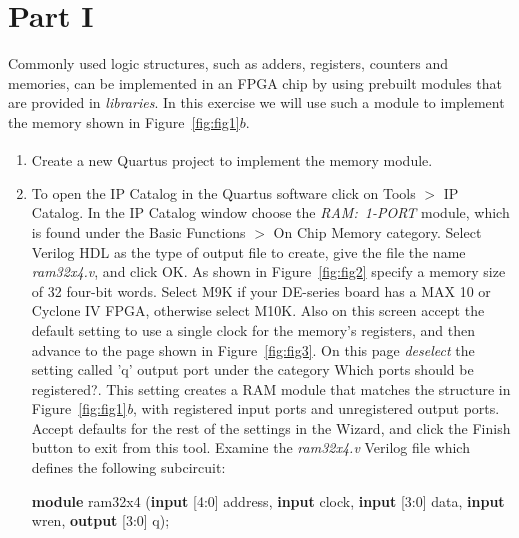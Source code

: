 \documentclass[epsfig,10pt,fullpage]{article}
\begin{document}
\section*{Part I}
Commonly used logic structures, such as adders, registers, counters and memories, 
can be implemented in an FPGA chip by using prebuilt modules that are provided in 
{\it libraries}.  In this exercise we will use such a module to implement the memory 
shown in Figure~\ref{fig:fig1}$b$.

\begin{enumerate}
\item Create a new Quartus\textsuperscript{\textregistered} project to implement the memory module.

\item To open the IP Catalog in the Quartus software click on {\sf Tools} $>$ {\sf IP Catalog}. 
In the IP Catalog window choose the {\it RAM:~1-PORT} module, which is found under 
the {\sf Basic Functions $>$  On Chip Memory} category.  Select {\sf Verilog HDL} as the type 
of output file to create, give the file the name {\it ram32x4.v}, and click {\sf OK}. 
As shown in Figure~\ref{fig:fig2} specify a memory size of 32 four-bit words. Select M9K if 
your DE-series board has a MAX 10 or Cyclone IV FPGA, otherwise select M10K. 
Also on this screen accept the default setting to use a single clock for the memory's registers,
and then advance to the page shown in Figure~\ref{fig:fig3}. On this page {\it deselect} the 
setting called {\sf 'q' output port} under the category {\sf Which ports should be registered?}.
This setting creates a RAM module that matches the structure in Figure~\ref{fig:fig1}{\it b}, 
with registered input ports and unregistered output ports. Accept defaults for the rest of 
the settings in the Wizard, and click the {\sf Finish} button to exit from this tool.  Examine the 
{\it ram32x4.v} Verilog file which defines the following subcircuit:

\begin{center}
{\bf module} ram32x4 ({\bf input} [4:0] address, {\bf input} clock, {\bf input} [3:0] data, 
{\bf input} wren, {\bf output} [3:0] q);
\end{center}


\end{enumerate}
\end{document}
